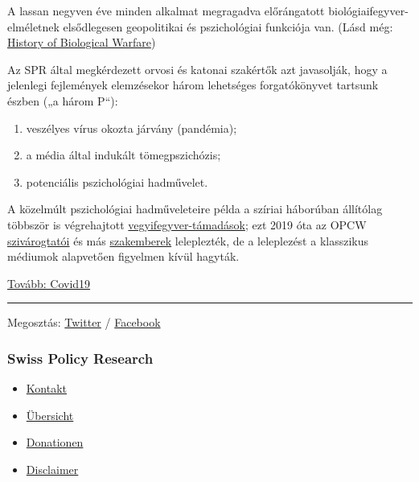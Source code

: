 A lassan negyven éve minden alkalmat megragadva előrángatott
biológiaifegyver-elméletnek elsődlegesen geopolitikai és pszichológiai
funkciója van. (Lásd még:
\href{https://www.emedicinehealth.com/biological_warfare/article_em.htm}{History
of Biological Warfare})

Az SPR által megkérdezett orvosi és katonai szakértők azt javasolják,
hogy a jelenlegi fejlemények elemzésekor három lehetséges forgatókönyvet
tartsunk észben („a három P``):

\begin{enumerate}
\def\labelenumi{\arabic{enumi}.}
\tightlist
\item
  veszélyes vírus okozta járvány (pandémia);
\item
  a média által indukált tömegpszichózis;
\item
  potenciális pszichológiai hadművelet.
\end{enumerate}

A közelmúlt pszichológiai hadműveleteire példa a szíriai háborúban
állítólag többször is végrehajtott
\href{https://www.globalresearch.ca/the-bbc-saving-syrias-children-documentary-staged-events-fake-video-footage/5470158}{vegyifegyver-támadások};
ezt 2019 óta az OPCW
\href{https://thegrayzone.com/2020/01/22/ian-henderson-opcw-whistleblower-un-no-chemical-attack-douma-syria/}{szivárogtatói}
és más
\href{https://www.theamericanconservative.com/articles/ex-weapons-inspector-trumps-sarin-claims-built-on-lie/}{szakemberek}
leleplezték, de a leleplezést a klasszikus médiumok alapvetően figyelmen
kívül hagyták.

\href{https://swprs.org/egy-svajci-orvos-a-covid-19-rol/}{Tovább:
Covid19}

\begin{center}\rule{0.5\linewidth}{\linethickness}\end{center}

Megosztás:
\href{https://twitter.com/intent/tweet?url=https://swprs.org/korona-media-propaganda/}{Twitter}
/
\href{https://www.facebook.com/share.php?u=https://swprs.org/korona-media-propaganda/}{Facebook}

\hypertarget{swiss-policy-research}{%
\subsubsection{Swiss Policy Research}\label{swiss-policy-research}}

\begin{itemize}
\tightlist
\item
  \href{https://swprs.org/kontakt/}{Kontakt}
\item
  \href{https://swprs.org/uebersicht/}{Übersicht}
\item
  \href{https://swprs.org/donationen/}{Donationen}
\item
  \href{https://swprs.org/disclaimer/}{Disclaimer}
\end{itemize}

